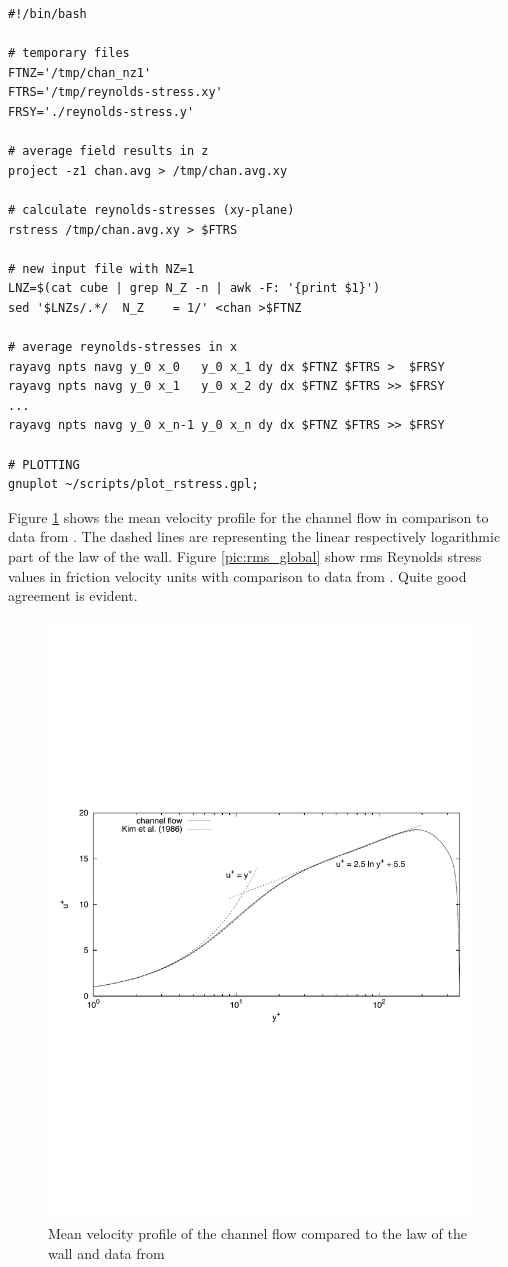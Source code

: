 \documentclass[11pt]{report}
\begin{document}
{\small
\begin{verbatim}
#!/bin/bash

# temporary files
FTNZ='/tmp/chan_nz1'
FTRS='/tmp/reynolds-stress.xy'
FRSY='./reynolds-stress.y'

# average field results in z
project -z1 chan.avg > /tmp/chan.avg.xy

# calculate reynolds-stresses (xy-plane)
rstress /tmp/chan.avg.xy > $FTRS

# new input file with NZ=1
LNZ=$(cat cube | grep N_Z -n | awk -F: '{print $1}')
sed '$LNZs/.*/  N_Z    = 1/' <chan >$FTNZ

# average reynolds-stresses in x
rayavg npts navg y_0 x_0   y_0 x_1 dy dx $FTNZ $FTRS >  $FRSY
rayavg npts navg y_0 x_1   y_0 x_2 dy dx $FTNZ $FTRS >> $FRSY
...
rayavg npts navg y_0 x_n-1 y_0 x_n dy dx $FTNZ $FTRS >> $FRSY

# PLOTTING
gnuplot ~/scripts/plot_rstress.gpl;
\end{verbatim}
}

Figure \ref{pic:u_wall} shows the mean velocity profile for the
channel flow in comparison to data from \citet{kmm87}. The dashed
lines are representing the linear respectively logarithmic part of the
law of the wall.  Figure \ref{pic:rms_global} show rms Reynolds stress
values in friction velocity units with comparison to data from
\citet{kmm87}.  Quite good agreement is evident.

\begin{figure}
\centering
\includegraphics[width=0.7\linewidth]{dns_u_wall}
\caption{Mean velocity profile of the channel flow compared to the law
  of the wall and data from \citet{kmm87}}
\label{pic:u_wall}
\end{figure}
\end{document}
